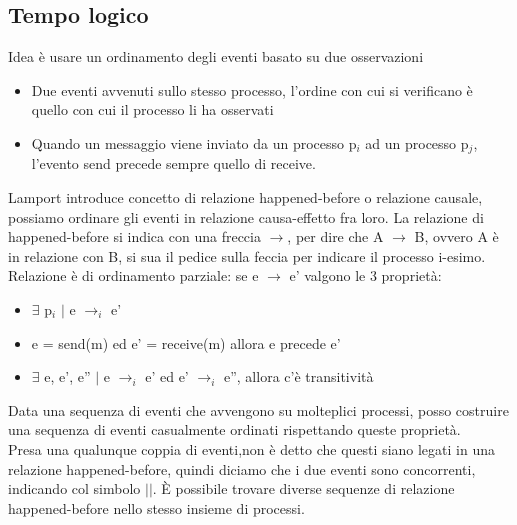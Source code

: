 \documentclass[16px]{article}
\begin{document}
\subsection{Tempo logico}
Idea è usare un ordinamento degli eventi basato su due osservazioni
\begin{itemize}
\item Due eventi avvenuti sullo stesso processo, l'ordine con cui si verificano è quello con cui il processo li ha osservati
\item Quando un messaggio viene inviato da un processo p$_i$ ad un processo p$_j$, l'evento send precede sempre quello di receive.
\end{itemize}
Lamport introduce concetto di relazione happened-before o relazione causale, possiamo ordinare gli eventi in relazione causa-effetto fra loro. La relazione di happened-before si indica con una freccia $\rightarrow$, per dire che  A $\rightarrow$ B, ovvero A è in relazione con B, si sua il pedice sulla feccia per indicare il processo i-esimo.\\ Relazione è di ordinamento parziale: se e $\rightarrow$ e' valgono le 3 proprietà:
\begin{itemize}
\item $\exists$ p$_i$ $|$ e $\rightarrow_i$ e'
\item e = send(m) ed e' = receive(m) allora e precede e'
\item $\exists$ e, e', e'' $|$ e $\rightarrow_i$ e' ed e' $\rightarrow_i$ e'', allora c'è transitività
\end{itemize}
Data una sequenza di eventi che avvengono su molteplici processi, posso costruire una sequenza di eventi casualmente ordinati rispettando queste proprietà.\\ Presa una qualunque coppia di eventi,non è detto che questi siano legati in una relazione happened-before, quindi diciamo che i due eventi sono concorrenti, indicando col simbolo $||$. È possibile trovare diverse sequenze di relazione happened-before nello stesso insieme di processi.
\end{document}
